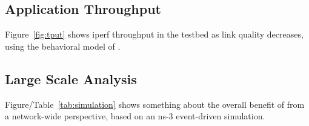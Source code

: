 \subsection{Application Throughput}
Figure~\ref{fig:tput} shows iperf throughput in the testbed as link quality
decreases, using the behavioral model of \OurSys. 

\subsection{Large Scale Analysis}
Figure/Table~\ref{tab:simulation} shows something about the overall benefit of \OurSys from a network-wide perspective, based on an ns-3 event-driven simulation.




